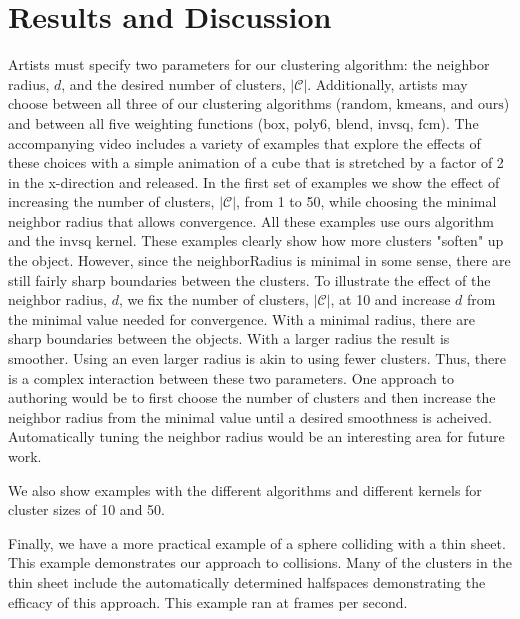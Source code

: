 \documentclass[review]{acmsiggraph}
\begin{document}
\section{Results and Discussion}
\label{sec:results}

Artists must specify two parameters for our clustering algorithm: the neighbor radius, $d$, and the desired number of clusters, 
$|\mathcal{C}|$.  Additionally, artists may choose between all three of our clustering algorithms ($\mathrm{random}$, $\mathrm{kmeans}$,
and $\mathrm{ours}$) and between all five weighting functions ($\mathrm{box}$, $\mathrm{poly6}$, $\mathrm{blend}$, $\mathrm{invsq}$, 
$\mathrm{fcm}$). The accompanying video includes a variety of examples that explore the effects of these choices with a simple animation
of a cube that is stretched by a factor of 2 in the x-direction and released.
In the first set of examples we show the effect of increasing the number of clusters, $|\mathcal{C}|$, from 1 to 50, while choosing the
minimal neighbor radius that allows convergence.  All these examples use $\mathrm{ours}$ algorithm and the $\mathrm{invsq}$ kernel.
These examples clearly show how more clusters "soften" up the object.  
However, since the neighborRadius is minimal in some sense, there are still fairly sharp boundaries between the clusters.
To illustrate the effect of the neighbor radius, $d$, we fix the number of clusters, $|\mathcal{C}|$, at 10 and increase $d$ from
the minimal value needed for convergence.  With a minimal radius, there are sharp boundaries between the objects.  With a larger
radius the result is smoother.  Using an even larger radius is akin to using fewer clusters.  Thus, there is a complex interaction
between these two parameters.  One approach to authoring would be to first choose the number of clusters and then increase the neighbor
radius from the minimal value until a desired smoothness is acheived.  Automatically tuning the neighbor radius would be an interesting
area for future work.

We also show examples with the different algorithms and different kernels for cluster sizes of 10 and 50.  

Finally, we have a more practical example of a sphere colliding with a thin sheet.  This example demonstrates our approach
to collisions.  Many of the clusters in the thin sheet include the automatically determined halfspaces demonstrating the efficacy
of this approach.  This example ran at  frames per second.
\end{document}
